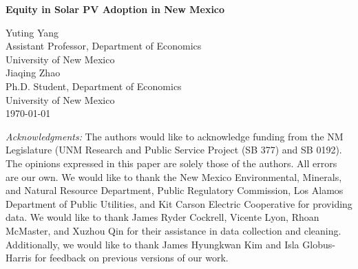 \begin{titlepage}

\newcommand{\HRule}{\rule{\linewidth}{0.5mm}} 

\begin{center} %



{ \huge \bfseries Equity in Solar PV Adoption in New Mexico}\\ %
\end{center}
\vspace{1.5em}

\begin{center}
    \large
Yuting Yang\\ %
Assistant Professor, Department of Economics\\
University of New Mexico\\
\vspace{1em}
Jiaqing Zhao\\ %
Ph.D. Student, Department of Economics\\
University of New Mexico\\
\vspace{1.5em}
\today


\vspace{1.5em}
\begin{flushleft}
\normalsize

    \textit{Acknowledgments:} The authors would like to acknowledge funding from the NM Legislature (UNM Research and Public Service Project (SB 377) and SB 0192). The opinions expressed in this paper are solely those of the authors. All errors are our own. We would like to thank the New Mexico Environmental, Minerals, and Natural Resource Department, Public Regulatory Commission, Los Alamos Department of Public Utilities, and Kit Carson Electric Cooperative for providing data. We would like to thank James Ryder Cockrell, Vicente Lyon, Rhoan McMaster, and Xuzhou Qin for their assistance in data collection and cleaning. Additionally, we would like to thank 
    James Hyungkwan Kim and Isla Globus-Harris for feedback on previous versions of our work.  \\


\end{flushleft}
\end{center}
\end{titlepage}
